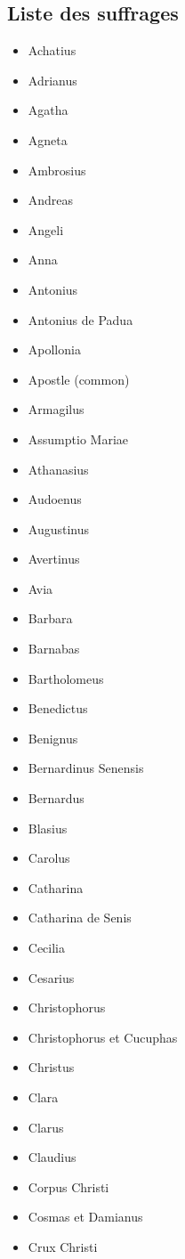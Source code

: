 \documentclass[a4paper,12pt,twoside]{book}
\begin{document}
	\subsection{Liste des suffrages}
	
	\begin{itemize}
\item Achatius
\item Adrianus
\item Agatha
\item Agneta
\item Ambrosius
\item Andreas
\item Angeli
\item Anna
\item Antonius
\item Antonius de Padua
\item Apollonia
\item Apostle (common)
\item Armagilus
\item Assumptio Mariae
\item Athanasius
\item Audoenus
\item Augustinus
\item Avertinus
\item Avia
\item Barbara
\item Barnabas
\item Bartholomeus
\item Benedictus
\item Benignus
\item Bernardinus Senensis
\item Bernardus
\item Blasius
\item Carolus
\item Catharina
\item Catharina de Senis
\item Cecilia
\item Cesarius
\item Christophorus
\item Christophorus et Cucuphas
\item Christus
\item Clara 
\item Clarus
\item Claudius
\item Corpus Christi
\item Cosmas et Damianus
\item Crux Christi

\end{itemize}
\end{document}
